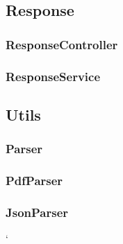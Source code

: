 \subsection{Response}\label{subsec:response}

\subsubsection{ResponseController}\label{subsubsec:response_controller}

\subsubsection{ResponseService}\label{subsubsec:response_service}

\subsection{Utils}\label{subsec:utils}

\subsubsection{Parser}\label{subsubsec:parser}

\subsubsection{PdfParser}\label{subsubsec:pdf_parser}

\subsubsection{JsonParser}\label{subsubsec:json_parser}`